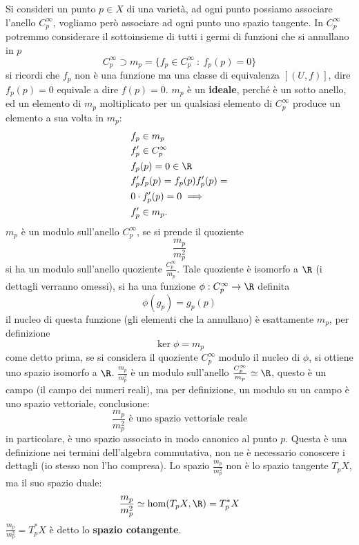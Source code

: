 \documentclass[10pt, letterpaper]{report}
\begin{document}
Si consideri un punto $p\in X$ di una varietà, ad ogni punto possiamo associare l'anello $C_p^\infty$, vogliamo però associare ad ogni punto uno spazio tangente. In $C_p^\infty$ potremmo considerare il sottoinsieme di  tutti i germi di funzioni che si annullano in $p$\begin{equation}
    C_p^\infty \supset m_p = \{f_p\in C_p^\infty \ :  \ f_p(p)=0 \}
\end{equation}
si ricordi che $f_p$ non è una funzione ma una classe di equivalenza $[(U,f)]$, dire $f_p(p)=0$ equivale a dire $f(p)=0$. $m_p$ è un \textbf{ideale}, perché è un sotto anello, ed un elemento di $m_p$ moltiplicato per un qualsiasi elemento di $ C_p^\infty$ produce un elemento a sua volta in  $m_p$:\begin{align}
    &f_p\in m_p\\ 
    &f'_p\in C_p^\infty \\ 
    &f_p(p)=0\in \R\\
    &f'_pf_p(p) =f_p(p)f'_p(p)=\\& 0\cdot f'_p(p)=0\implies\\
   & f'_p\in m_p.
\end{align}
$m_p$ è un modulo sull'anello $C_p^\infty$, se si prende il quoziente \begin{equation}
    \frac{m_p}{m_p^2}
\end{equation}
si ha un modulo sull'anello quoziente $\frac{C_p^\infty}{m_p}$. Tale quoziente è isomorfo a $\R$ (i dettagli verranno omessi), si ha una funzione $\phi:C_p^\infty\rightarrow \R$ definita\begin{equation}
    \phi(g_p)=g_p(p)
\end{equation}
il nucleo di questa funzione (gli elementi che la annullano) è esattamente $m_p$, per definizione\begin{equation}
    \ker\phi=m_p 
\end{equation} 
come detto prima, se si considera il quoziente  $C_p^\infty$ modulo il nucleo di $\phi$, si ottiene uno spazio isomorfo a $\R$. $\frac{m_p}{m_p^2}$ è un modulo sull'anello $\frac{C_p^\infty}{m_p}\simeq \R$, questo è un campo (il campo dei numeri reali), ma per definizione, un modulo su un campo è uno spazio vettoriale, conclusione:\begin{equation}
    \frac{m_p}{m_p^2}\text{ è uno spazio vettoriale reale}
\end{equation}
in particolare, è uno spazio associato in modo canonico al punto $p$. Questa è una definizione nei termini dell'algebra commutativa, non ne è necessario conoscere i dettagli (io stesso non l'ho compresa). Lo spazio $\frac{m_p}{m_p^2}$ non è lo spazio tangente $T_pX$, ma il suo spazio duale:\begin{equation}
     \frac{m_p}{m_p^2}\simeq \hom(T_pX,\R)=T_p^*X
\end{equation}
$ \frac{m_p}{m_p^2}=T_p^*X$ è detto lo \textbf{spazio cotangente}.\bigskip
\end{document}
